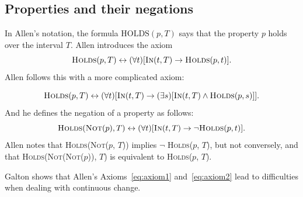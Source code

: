 \subsection{Properties and their negations}
In Allen's notation, the formula $\text{HOLDS}(p, T)$ says that the property $p$ holds over the interval $T$.
Allen introduces the axiom
\begin{equation}
	\textsc{Holds}(p, T) \leftrightarrow (\forall t) [\textsc{In}(t, T) \to \textsc{Holds}(p, t)].
\end{equation}
Allen follows this with a more complicated axiom:

\begin{equation}
	\textsc{Holds}(p, T) \leftrightarrow (\forall t) [\textsc{In}(t, T) \to (\exists s)[\textsc{In}(t, T) \land \textsc{Holds}(p, s)]].
	\label{eq:axiom1}
\end{equation}
And he defines the negation of a property as follows:
\begin{equation}
	\textsc{Holds}(\textsc{Not}(p), T) \leftrightarrow (\forall t) [\textsc{In}(t, T) \to \neg \textsc{Holds}(p, t)].
	\label{eq:axiom2}
\end{equation}
Allen notes that \textsc{Holds}(\textsc{Not}($p$, $T$)) implies $\neg$ \textsc{Holds}($p$, $T$), but not conversely, and that \textsc{Holds}(\textsc{Not}(\textsc{Not}($p$)), $T$) is equivalent to \textsc{Holds}($p$, $T$).

Galton shows that Allen's Axioms~\ref{eq:axiom1} and~\ref{eq:axiom2} lead to difficulties when dealing with continuous change.

